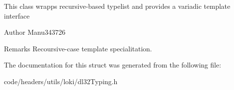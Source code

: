 This class wrapps recursive-\/based typelist and provides a variadic template interface

\begin{DoxyAuthor}{Author}
Manu343726
\end{DoxyAuthor}
\begin{DoxyRemark}{Remarks}
Recoursive-\/case template specialitation. 
\end{DoxyRemark}


The documentation for this struct was generated from the following file\-:\begin{DoxyCompactItemize}
\item 
code/headers/utils/loki/dl32\-Typing.\-h\end{DoxyCompactItemize}
